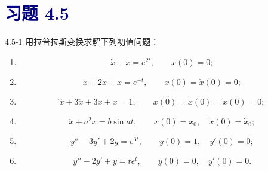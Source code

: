 \documentclass[UTF8,a4paper,11pt]{ctexart}
\newcommand{\sect}[1]{\section*{\textcolor{navy}{习题 #1}}}
\begin{document}
\sect{4.5}
\begin{problem}{4.5-1}
用拉普拉斯变换求解下列初值问题：
  \begin{enumerate}[label=(\arabic*)]
    \item
    \[
      \dot{x}-x=e^{2t},\qquad x(0)=0;
    \]
    \item
    \[
      \ddot{x}+2\dot{x}+x=e^{-t},\qquad x(0)=\dot{x}(0)=0;
    \]
    \item
    \[
      \dddot{x}+3\ddot{x}+3\dot{x}+x=1,\qquad
      x(0)=\dot{x}(0)=\ddot{x}(0)=0;
    \]
    \item
    \[
      \ddot{x}+a^2x=b\sin at,\qquad x(0)=x_0,\quad \dot{x}(0)=\dot{x}_0;
    \]
    \item
    \[
      y''-3y'+2y=e^{3t},\qquad y(0)=1,\quad y'(0)=0;
    \]
    \item
    \[
      y''-2y'+y=te^t,\qquad y(0)=0,\quad y'(0)=0.
    \]
  \end{enumerate}
\end{problem}
\end{document}

